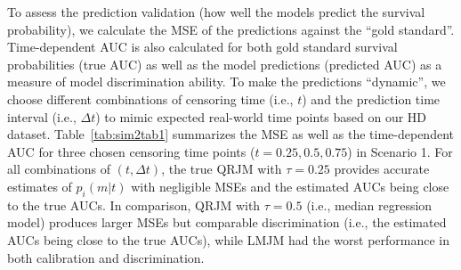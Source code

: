 \documentclass[Crown, sagev, times, doublespace]{sagej}
\begin{document}
To assess the prediction validation (how well the models predict the survival probability), we calculate the MSE of the predictions against the ``gold standard''. Time-dependent AUC is also calculated for both gold standard survival probabilities (true AUC) as well as the model predictions (predicted AUC) as a measure of model discrimination ability. To make the predictions ``dynamic'', we choose different combinations of censoring time (i.e., $t$) and the prediction time interval (i.e., $\Delta t$) to mimic expected real-world time points based on our HD dataset. Table~\ref{tab:sim2tab1} summarizes the MSE as well as the time-dependent AUC for three chosen censoring time points ($t=0.25, 0.5, 0.75$) in Scenario 1. For all combinations of $(t, \Delta t)$, the true QRJM with $\tau = 0.25$ provides accurate estimates of $p_i(m|t)$ with negligible MSEs and the estimated AUCs being close to the true AUCs. In comparison, QRJM with $\tau = 0.5$ (i.e., median regression model) produces larger MSEs but comparable discrimination (i.e., the estimated AUCs being close to the true AUCs), while LMJM had the worst performance in both calibration and discrimination.
\end{document}

